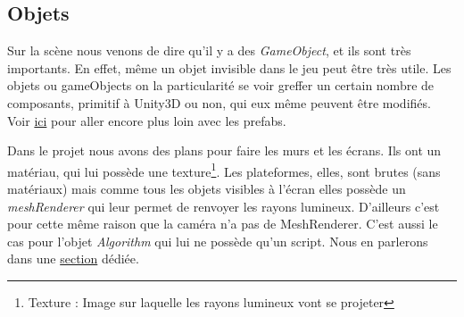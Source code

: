 \documentclass[a4paper,11pt]{myreport}
\begin{document}
	\newpage
	\subsection{Objets}
	\par Sur la scène nous venons de dire qu'il y a des \textit{GameObject}, et ils sont très importants. En effet, même un objet invisible dans le jeu peut être très utile.
	Les objets ou gameObjects on la particularité se voir greffer un certain nombre de composants, primitif à Unity3D ou non, qui eux même peuvent être modifiés. Voir \hyperlink{prefabTarget}{ici} pour aller encore plus loin avec les prefabs.

	\par Dans le projet nous avons des plans pour faire les murs et les écrans. Ils ont un matériau, qui lui possède une texture\footnote{Texture : Image sur laquelle les rayons lumineux vont se projeter}. Les plateformes, elles, sont brutes (sans matériaux) mais comme tous les objets visibles à l'écran elles possède un \textit{meshRenderer} qui leur permet de renvoyer les rayons lumineux. D'ailleurs c'est pour cette même raison que la caméra n'a pas de MeshRenderer. C'est aussi le cas pour l'objet \textit{Algorithm} qui lui ne possède qu'un script. Nous en parlerons dans une \hyperlink{prefabTarget}{section} dédiée.
\end{document}

